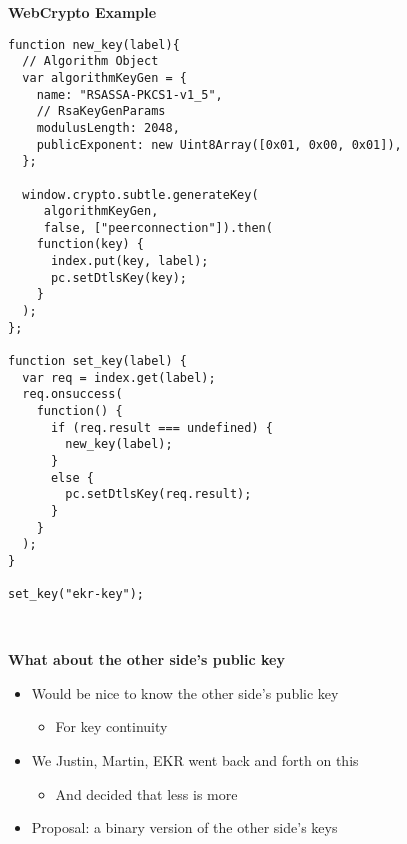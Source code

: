 \documentclass[helvetica]{seminar}
\newcommand{\heading}[1]{%
  \begin{center} 
    \large\bf 
    #1 
  \end{center} 
  \vspace{.4 in}}
\begin{document}
\begin{slide}
\heading{WebCrypto Example}

\begin{multicols}{2}
{\tiny
\begin{verbatim}
function new_key(label){ 
  // Algorithm Object
  var algorithmKeyGen = {
    name: "RSASSA-PKCS1-v1_5",
    // RsaKeyGenParams
    modulusLength: 2048,
    publicExponent: new Uint8Array([0x01, 0x00, 0x01]),
  };
  
  window.crypto.subtle.generateKey(
     algorithmKeyGen,
     false, ["peerconnection"]).then(
    function(key) {
      index.put(key, label);
      pc.setDtlsKey(key);
    }
  );
};

function set_key(label) {
  var req = index.get(label);
  req.onsuccess(
    function() {
      if (req.result === undefined) {
        new_key(label);
      }
      else {
        pc.setDtlsKey(req.result);
      }
    }
  );
}

set_key("ekr-key");



\end{verbatim}
}
\end{multicols}
\end{slide}


\begin{slide}
\heading{What about the other side's public key}

\begin{itemize}
\item Would be nice to know the other side's public key
  \begin{itemize}
    \item For key continuity
  \end{itemize}

\item We {Justin, Martin, EKR} went back and forth on this
  \begin{itemize}
  \item And decided that less is more
  \end{itemize}

\item Proposal: a binary version of the other side's keys
\end{itemize}

\end{slide}
\end{document}
